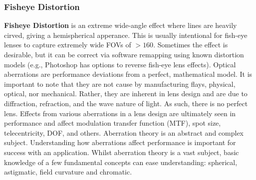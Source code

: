 \documentclass[10pt]{article}
\begin{document}
\begin{multicols}{2}
\subsubsection{Fisheye Distortion}
\textbf{Fisheye Distortion} is an extreme wide-angle effect where lines are heavily cirved, giving a hemispherical apperance. This is usually intentional for fish-eye lenses to capture extremely wide FOVs of $>160$\textdegree. Sometimes the effect is desirable, but it can be correct via software remapping using known distortion models (e.g., Photoshop has options to reverse fish-eye lens effects).
\newline \newline
Optical aberrations are performance deviations from a perfect, mathematical model. It is important to note that they are not cause by manufacturing flays, physical, optical, nor mechanical. Rather, they are inherent in lens design and are due to diffraction, refraction, and the wave nature of light. As such, there is no perfect lens.
Effects from various aberrations in a lens design are ultimately seen in performance and affect modulation transfer function (MTF), spot size, telecentricity, DOF, and others. Aberration theory is an abstract and complex subject. Understanding how aberrations affect performance is important for success with an application.
Whilst aberration theory is a vast subject, basic knowledge of a few fundamental concepts can ease understanding: spherical, astigmatic, field curvature and chromatic.
\newline \newline

\end{multicols}
\end{document}
